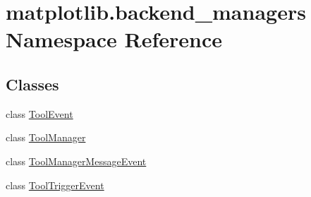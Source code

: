 \hypertarget{namespacematplotlib_1_1backend__managers}{}\section{matplotlib.\+backend\+\_\+managers Namespace Reference}
\label{namespacematplotlib_1_1backend__managers}
\subsection*{Classes}
\begin{DoxyCompactItemize}
\item 
class \hyperlink{classmatplotlib_1_1backend__managers_1_1ToolEvent}{Tool\+Event}
\item 
class \hyperlink{classmatplotlib_1_1backend__managers_1_1ToolManager}{Tool\+Manager}
\item 
class \hyperlink{classmatplotlib_1_1backend__managers_1_1ToolManagerMessageEvent}{Tool\+Manager\+Message\+Event}
\item 
class \hyperlink{classmatplotlib_1_1backend__managers_1_1ToolTriggerEvent}{Tool\+Trigger\+Event}
\end{DoxyCompactItemize}
